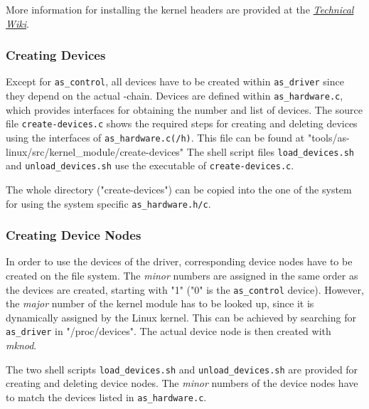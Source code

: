 More information for installing the kernel headers are provided at the \href{http://ti-wiki.informatik.hs-augsburg.de/doku.php?id=linux_microzed}{\textit{Technical Wiki}}.

\subsubsection{Creating Devices}
Except for \texttt{as\_control}, all devices have to be created within \texttt{as\_driver} since they depend on the actual \asterics-chain.
Devices are defined within \texttt{as\_hardware.c}, which provides interfaces for obtaining the number and list of devices.
The source file \texttt{create-devices.c} shows the required steps for creating and deleting devices using the interfaces of \texttt{as\_hardware.c(/h)}.
This file can be found at "tools/as-linux/src/kernel\_module/create-devices"
The shell script files \texttt{load\_devices.sh} and \texttt{unload\_devices.sh} use the executable of \texttt{create-devices.c}.

The whole directory ("create-devices") can be copied into the one of the system for using the system specific \texttt{as\_hardware.h/c}.

\subsubsection{Creating Device Nodes}

In order to use the devices of the \asterics driver, corresponding device nodes have to be created on the file system.
The \textit{minor} numbers are assigned in the same order as the devices are created, starting with "1" ("0" is the \texttt{as\_control} device).
However, the \textit{major} number of the kernel module has to be looked up, since it is dynamically assigned by the Linux kernel.
This can be achieved by searching for \texttt{as\_driver} in "/proc/devices".
The actual device node is then created with \textit{mknod}.

The two shell scripts \texttt{load\_devices.sh} and \texttt{unload\_devices.sh} are provided for creating and deleting device nodes.
The \textit{minor} numbers of the device nodes have to match the devices listed in \texttt{as\_hardware.c}.
 

